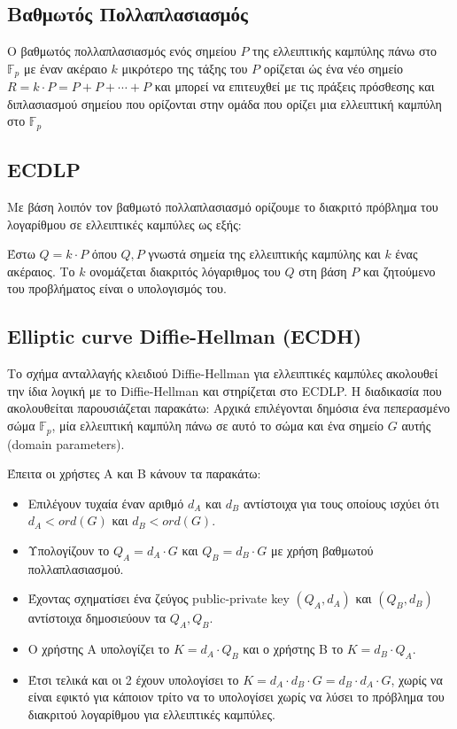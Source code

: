 \documentclass[12pt]{article}
\begin{document}
\subsection{Βαθμωτός Πολλαπλασιασμός}
Ο βαθμωτός πολλαπλασιασμός ενός σημείου $P$ της ελλειπτικής καμπύλης πάνω στο $\mathbb{F}_p$ με έναν ακέραιο $k$ μικρότερο της τάξης του $P$ ορίζεται ώς ένα νέο σημείο $R = k \cdot P = P + P + \cdots + P$ και μπορεί να επιτευχθεί με τις πράξεις πρόσθεσης και διπλασιασμού σημείου που ορίζονται στην ομάδα που ορίζει μια ελλειπτική καμπύλη στο $\mathbb{F}_p$
\subsection{ECDLP}
Με βάση λοιπόν τον βαθμωτό πολλαπλασιασμό ορίζουμε το διακριτό πρόβλημα του λογαρίθμου σε ελλειπτικές καμπύλες ως εξής:

 Έστω $Q = k \cdot P$ όπου $Q, P$ γνωστά σημεία της ελλειπτικής καμπύλης και $k$ ένας ακέραιος. Το $k$ ονομάζεται διακριτός λόγαριθμος του $Q$ στη βάση $P$ και ζητούμενο του προβλήματος είναι ο υπολογισμός του.
\subsection{Elliptic curve Diffie-Hellman (ECDH)}
 Το σχήμα ανταλλαγής κλειδιού Diffie-Hellman για ελλειπτικές καμπύλες ακολουθεί την ίδια λογική με το Diffie-Hellman και στηρίζεται στο ECDLP.
Η διαδικασία που ακολουθείται παρουσιάζεται παρακάτω:
Αρχικά επιλέγονται δημόσια ένα πεπερασμένο σώμα $\mathbb{F}_p$, μία ελλειπτική καμπύλη πάνω σε αυτό το σώμα και ένα σημείο $G$ αυτής (domain parameters).

 Έπειτα οι χρήστες Α και Β κάνουν τα παρακάτω:
\begin{itemize}
\item Επιλέγουν τυχαία έναν αριθμό $d_A$ και $d_B$ αντίστοιχα για τους οποίους ισχύει ότι $d_A < ord(G)$ και $d_B < ord(G)$.
\item Υπολογίζουν το $Q_A = d_A \cdot G$ και $Q_B = d_B \cdot G$ με χρήση βαθμωτού πολλαπλασιασμού.
\item Έχοντας σχηματίσει ένα ζεύγος public-private key $(Q_A,d_A)$ και $(Q_B, d_B)$ αντίστοιχα δημοσιεύουν τα $Q_A, Q_B$.
\item Ο χρήστης Α υπολογίζει το $K = d_A \cdot Q_B$ και ο χρήστης Β το $K = d_B \cdot Q_A$.
\item Έτσι τελικά και οι 2 έχουν υπολογίσει το $K = d_A \cdot d_B \cdot G = d_B \cdot d_A \cdot G$, χωρίς να είναι εφικτό για κάποιον τρίτο να το υπολογίσει χωρίς να λύσει το πρόβλημα του διακριτού λογαρίθμου για ελλειπτικές καμπύλες.
\end{itemize}
\end{document}
